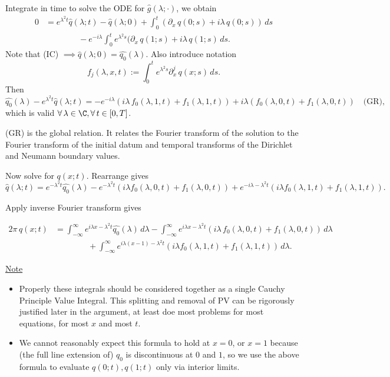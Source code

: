 \documentclass[11pt, oneside, a4paper]{article}
\begin{document}
Integrate in time to solve the ODE for $\widehat{g}(\lambda;\cdot)$, we obtain
\begin{align*}
    0 &= e^{\lambda^2t}\widehat{q}(\lambda;t) - \widehat{q}(\lambda;0) + \int_0^t(\partial_x\,q(0;s) + i\lambda\,q(0;s))\,ds \\
    &\qquad \qquad - e^{-i\lambda}\int_0^te^{\lambda^2s}(\partial_x\,q(1;s) + i\lambda\,q(1;s)\,ds.
\end{align*}
Note that (IC) $\implies \widehat{q}(\lambda;0) = \widehat{q_0}(\lambda)$. Also introduce notation \[f_j(\lambda,x,t) := \int_0^te^{\lambda^2s}\partial_x^j\,q(x;s)\,ds.\]
Then
\[\widehat{q_0}(\lambda) - e^{\lambda^2t}\widehat{q}(\lambda;t) = -e^{-i\lambda}\left(i\lambda\,f_0(\lambda,1,t) + f_1(\lambda,1,t)\right) + i\lambda(f_0(\lambda,0,t) + f_1(\lambda,0,t)) \quad \text{(GR)},\]
which is valid $\forall\,\lambda\in\C, \forall\, t\in[0,T]$.

(GR) is the global relation. It relates the Fourier transform of the solution to the Fourier transform of the initial datum and temporal transforms of the Dirichlet and Neumann boundary values.

Now solve for $q(x;t)$. Rearrange gives
\[\widehat{q}(\lambda;t) = e^{-\lambda^2t}\widehat{q_0}(\lambda) - e^{-\lambda^2t}(i\lambda f_0(\lambda,0,t) + f_1(\lambda,0,t)) + e^{-i\lambda - \lambda^2t}(i\lambda f_0(\lambda, 1, t) + f_1(\lambda,1,t)).\]

Apply inverse Fourier transform gives

\begin{align*}
  2\pi\,q(x;t) &= \int_{-\infty}^\infty e^{i\lambda x - \lambda^2 t}\widehat{q_0}(\lambda)\,d\lambda - \int_{-\infty}^\infty e^{i\lambda x - \lambda^2 t}(i\lambda\,f_0(\lambda,0,t)+f_1(\lambda,0,t))\,d\lambda \\
  &\qquad \qquad + \int_{-\infty}^\infty e^{i\lambda(x-1)-\lambda^2t}(i\lambda f_0(\lambda,1,t) + f_1(\lambda,1,t))\,d\lambda.
\end{align*}

\underline{Note} \begin{itemize}
    \item Properly these integrals should be considered together as a single Cauchy Principle Value Integral. This splitting and removal of PV can be rigorously justified later in the argument, at least doe most problems for most equations, for most $x$ and most $t$.
    \item We cannot reasonably expect this formula to hold at $x = 0$, or $x = 1$ because (the full line extension of) $q_0$ is discontinuous at $0$ and $1$, so we use the above formula to evaluate $q(0;t), q(1;t)$ only via interior limits. 
\end{itemize}
    
\end{document}
